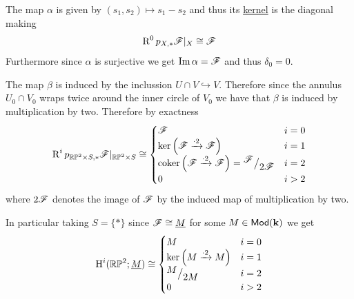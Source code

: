 \documentclass[../../main]{subfiles}
\begin{document}
\begin{example}[\(\mathbb{RP}^{2}\)]
  The map \(\alpha\) is given by \((s_{1}, s_{2}) \mapsto s_{1} - s_{2}\) and thus its \hyperref[def:categorical-kernel]{kernel} is the diagonal making
  \begin{equation*}
    \operatorname{R}^{0}p_{X, \ast}\mathscr{F}|_{X} \cong \mathscr{F}
  \end{equation*}
  Furthermore since \(\alpha\) is surjective we get \(\operatorname{Im} \alpha = \mathscr{F}\) and thus \(\delta_{0} = 0\).

  The map \(\beta\) is induced by the inclussion \(U \cap V \hookrightarrow V\).
  Therefore since the annulus \(U_{0} \cap V_{0}\) wraps twice around the inner circle of \(V_{0}\) we have that \(\beta\) is induced by multiplication by two.
  Therefore by exactness
  \begin{equation*}
    \operatorname{R}^{i}p_{\mathbb{RP}^{2} \times S, \ast}\mathscr{F}|_{\mathbb{RP}^{2} \times S} \cong \begin{cases}
      \mathscr{F} & i = 0 \\
      \ker \left(\mathscr{F} \xrightarrow{\cdot 2} \mathscr{F} \right) & i = 1 \\
      \operatorname*{coker} \left( \mathscr{F} \xrightarrow{\cdot 2} \mathscr{F} \right) = {^{\textstyle \mathscr{F}}\big/_{\textstyle 2 \mathscr{F}}} & i = 2 \\
      0 & i > 2
    \end{cases}
  \end{equation*}
  where \(2\mathscr{F}\) denotes the image of \(\mathscr{F}\) by the induced map of multiplication by two.

  In particular taking \(S = \{\ast\}\) since \(\mathscr{F} \cong \underline{M}\) for some \(M \in \mathsf{Mod}(\mathbf{k})\) we get
  \begin{equation*}
    \operatorname{H}^{i}(\mathbb{RP}^{2}; \underline{M}) \cong \begin{cases}
      M & i = 0 \\
      \ker \left( M \xrightarrow{\cdot 2} M \right) & i = 1 \\
      {^{\textstyle M}\big/_{\textstyle 2 M}} & i = 2 \\
      0 & i > 2
    \end{cases}
  \end{equation*}
\end{example}
\end{document}
